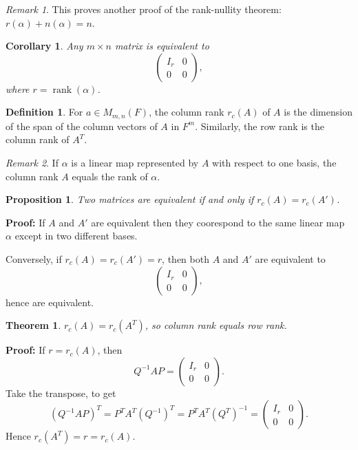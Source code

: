 \documentclass[12pt]{article}
\DeclareMathOperator{\rank}{rank}
\newtheorem{theorem}{Theorem}[section]
\newtheorem{corollary}{Corollary}[section]
\newtheorem{proposition}{Proposition}[section]
\theoremstyle{definition}
\newtheorem{definition}{Definition}[section]
\theoremstyle{remark}
\newtheorem*{remark}{Remark}
\begin{document}
\begin{remark}
	This proves another proof of the rank-nullity theorem: $r(\alpha) + n(\alpha) = n$.
\end{remark}

\begin{corollary}
	Any $m \times n$ matrix is equivalent to
	\[
	\begin{pmatrix}
		I_r & 0 \\
		0 & 0
	\end{pmatrix}
	,\]
	where $r = \rank(\alpha)$.
\end{corollary}

\begin{definition}
	For $a \in M_{m, n}(F)$, the column rank $r_c(A)$ of $A$ is the dimension of the span of the column vectors of $A$ in $F^{m}$. Similarly, the row rank is the column rank of $A^{T}$.
\end{definition}

\begin{remark}
	If $\alpha$ is a linear map represented by $A$ with respect to one basis, the column rank $A$ equals the rank of $\alpha$.
\end{remark}

\begin{proposition}
	Two matrices are equivalent if and only if $r_c(A) = r_c(A')$.
\end{proposition}

\begin{adjustbox}{minipage = \columnwidth - 25.5pt, margin=1em, frame=1pt, margin=0em}
\textbf{Proof:} If $A$ and $A'$ are equivalent then they coorespond to the same linear map $\alpha$ except in two different bases.

Conversely, if $r_c(A) = r_c(A') = r$, then both $A$ and $A'$ are equivalent to
\[
\begin{pmatrix}
	I_r & 0 \\
	0 & 0
\end{pmatrix}
,\]
hence are equivalent.
\end{adjustbox}

\begin{theorem}
	$r_c(A) = r_c(A^{T})$, so column rank equals row rank.
\end{theorem}

\begin{adjustbox}{minipage = \columnwidth - 25.5pt, margin=1em, frame=1pt, margin=0em}
	\textbf{Proof:} If $r = r_c(A)$, then
	\[
	Q^{-1}AP =
	\begin{pmatrix}
		I_r & 0 \\
		0 & 0
	\end{pmatrix}
	.\]
	Take the transpose, to get
	\[
		(Q^{-1}AP)^{T} = P^{T}A^{T}(Q^{-1})^{T} = P^{T}A^{T}(Q^{T})^{-1} =
		\begin{pmatrix}
			I_r & 0 \\
			0 & 0
		\end{pmatrix}
	.\]
	Hence $r_c(A^{T}) = r = r_c(A)$.
\end{adjustbox}
\end{document}
